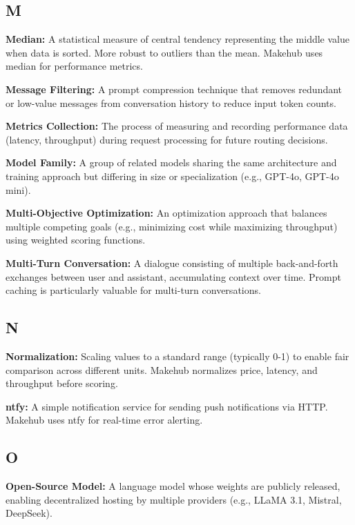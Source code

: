 \documentclass[english]{article}
\begin{document}
\subsection*{M}

\textbf{Median:} A statistical measure of central tendency representing the middle value when data is sorted. More robust to outliers than the mean. Makehub uses median for performance metrics.

\textbf{Message Filtering:} A prompt compression technique that removes redundant or low-value messages from conversation history to reduce input token counts.

\textbf{Metrics Collection:} The process of measuring and recording performance data (latency, throughput) during request processing for future routing decisions.

\textbf{Model Family:} A group of related models sharing the same architecture and training approach but differing in size or specialization (e.g., GPT-4o, GPT-4o mini).

\textbf{Multi-Objective Optimization:} An optimization approach that balances multiple competing goals (e.g., minimizing cost while maximizing throughput) using weighted scoring functions.

\textbf{Multi-Turn Conversation:} A dialogue consisting of multiple back-and-forth exchanges between user and assistant, accumulating context over time. Prompt caching is particularly valuable for multi-turn conversations.

\subsection*{N}

\textbf{Normalization:} Scaling values to a standard range (typically 0-1) to enable fair comparison across different units. Makehub normalizes price, latency, and throughput before scoring.

\textbf{ntfy:} A simple notification service for sending push notifications via HTTP. Makehub uses ntfy for real-time error alerting.

\subsection*{O}

\textbf{Open-Source Model:} A language model whose weights are publicly released, enabling decentralized hosting by multiple providers (e.g., LLaMA 3.1, Mistral, DeepSeek).
\end{document}
